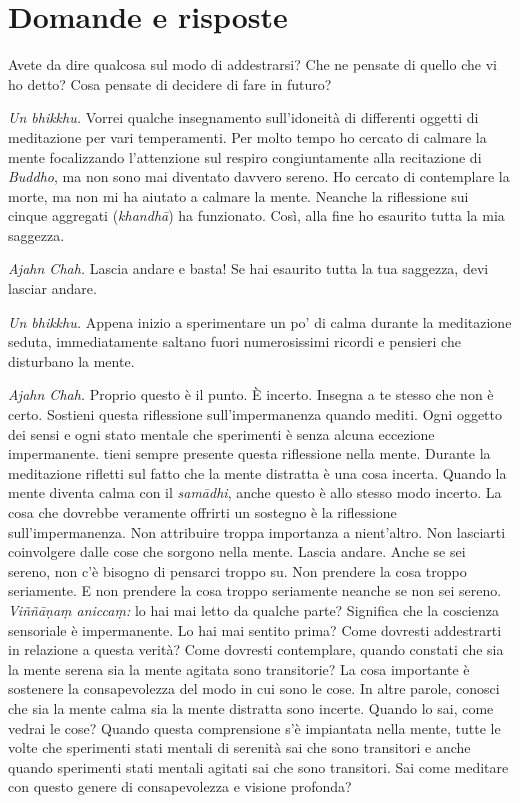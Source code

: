 \section{Domande e risposte}

Avete da dire qualcosa sul modo di addestrarsi? Che ne pensate di quello
che vi ho detto? Cosa pensate di decidere di fare in futuro?

\emph{Un bhikkhu.} Vorrei qualche insegnamento sull'idoneità di
differenti oggetti di meditazione per vari temperamenti. Per molto tempo
ho cercato di calmare la mente focalizzando l'attenzione sul respiro
congiuntamente alla recitazione di \emph{Buddho}, ma non sono mai
diventato davvero sereno. Ho cercato di contemplare la morte, ma non mi
ha aiutato a calmare la mente. Neanche la riflessione sui cinque
aggregati (\emph{khandhā}) ha funzionato. Così, alla fine ho esaurito
tutta la mia saggezza.

\emph{Ajahn Chah.} Lascia andare e basta! Se hai esaurito tutta la tua
saggezza, devi lasciar andare.

\emph{Un bhikkhu.} Appena inizio a sperimentare un po' di calma durante
la meditazione seduta, immediatamente saltano fuori numerosissimi
ricordi e pensieri che disturbano la mente.

\emph{Ajahn Chah.} Proprio questo è il punto. È incerto. Insegna a te stesso
che non è certo. Sostieni questa riflessione sull'impermanenza quando
mediti. Ogni oggetto dei sensi e ogni stato mentale che sperimenti è
senza alcuna eccezione impermanente. tieni sempre presente questa
riflessione nella mente. Durante la meditazione rifletti sul fatto che
la mente distratta è una cosa incerta. Quando la mente diventa calma con
il \emph{samādhi}, anche questo è allo stesso modo incerto. La cosa che
dovrebbe veramente offrirti un sostegno è la riflessione
sull'impermanenza. Non attribuire troppa importanza a nient'altro. Non
lasciarti coinvolgere dalle cose che sorgono nella mente. Lascia andare.
Anche se sei sereno, non c'è bisogno di pensarci troppo su. Non prendere
la cosa troppo seriamente. E non prendere la cosa troppo seriamente
neanche se non sei sereno. \emph{Viññāṇaṃ aniccaṃ:} lo hai mai letto da
qualche parte? Significa che la coscienza sensoriale è impermanente. Lo
hai mai sentito prima? Come dovresti addestrarti in relazione a questa
verità? Come dovresti contemplare, quando constati che sia la mente
serena sia la mente agitata sono transitorie? La cosa importante è
sostenere la consapevolezza del modo in cui sono le cose. In altre
parole, conosci che sia la mente calma sia la mente distratta sono
incerte. Quando lo sai, come vedrai le cose? Quando questa comprensione
s'è impiantata nella mente, tutte le volte che sperimenti stati mentali
di serenità sai che sono transitori e anche quando sperimenti stati
mentali agitati sai che sono transitori. Sai come meditare con questo
genere di consapevolezza e visione profonda?

